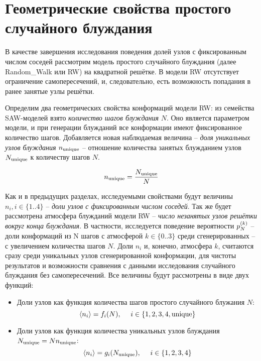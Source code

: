 \section{Геометрические свойства простого случайного блуждания}
\label{sec:neigh}

В качестве завершения исследования поведения долей узлов с фиксированным числом соседей рассмотрим модель простого случайного блуждания (далее Random\_Walk или RW) на квадратной решётке. 
В модели RW отсутствует ограничение самопересечений, и, следовательно, есть возможность попадания в ранее занятые узлы решётки.

Определим два геометрических свойства конформаций модели RW: из семейства SAW-моделей взято \textit{количество шагов блуждания} $N$. 
Оно является параметром модели, и при генерации блужданий все конформации имеют фиксированное количество шагов.
Добавляется новая наблюдаемая величина -- \textit{доля уникальных узлов блуждания} $n_{\textup{unique}}$ -- отношение количества занятых блужданием узлов $N_{\textup{unique}}$ к количеству шагов $N$.

\begin{equation}
n_{\textup{unique}} = \frac{N_{\textup{unique}}}{N}
\label{eq:nun}
\end{equation}

Как и в предыдущих разделах, исследуемыми свойствами будут величины $n_i, i \in \{1..4\}$ -- \textit{доли узлов с фиксированным числом соседей}. 
Так же будет рассмотрена атмосфера блужданий модели RW -- \textit{число незанятых узлов решётки вокруг конца блуждания}. 
В частности, исследуется поведение вероятности $p^{(k)}_N$ -- доли конформаций из N шагов с атмосферой $k \in \{0..3\}$ среди сгенерированных -- с увеличением количества шагов $N$.
Доли $n_i$ и, конечно, атмосфера $k$, считаются сразу среди уникальных узлов сгенерированной конформации, для чистоты результатов и возможности сравнения с данными исследования случайного блуждания без самопересечений.
Все величины будут рассмотрены в виде двух функций:

\begin{itemize}
\item Доли узлов как функция количества шагов простого случайного блужания $N$: 
\begin{equation}
 \langle n_i \rangle = f_i(N),\ \ \ \ i \in \{1,2,3,4, \textup{unique}\}
\label{eq:f_i}
\end{equation}
\item Доли узлов как функция количества уникальных узлов блуждания $N_{\textup{unique}} = N n_{\textup{unique}}$:
\begin{equation}
 \langle n_i \rangle = g_i(N_{\textup{unique}}),\ \ \ \ i \in \{1,2,3,4\} 
\label{eq:g_i}
\end{equation}
\end{itemize}

